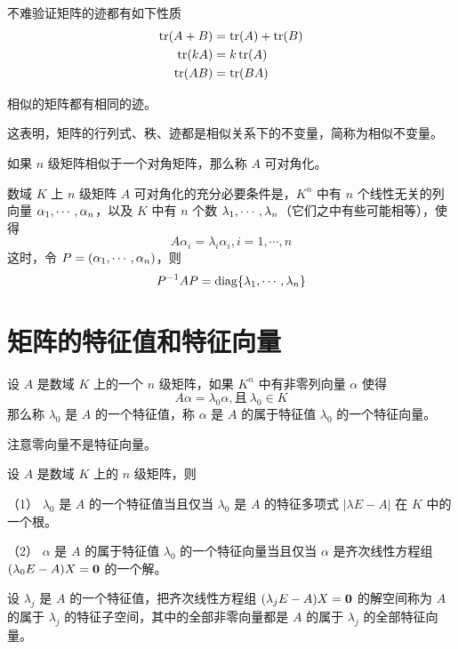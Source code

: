 不难验证矩阵的迹都有如下性质
\[
	\begin{aligned}
		\operatorname{tr}(A+B) & = \operatorname{tr}(A) + \operatorname{tr}(B) \\
		\operatorname{tr}(kA)  & = k\operatorname{tr}(A)         \\
		\operatorname{tr}(AB)  & = \operatorname{tr}(BA)
	\end{aligned}
\]

\begin{theorem}
	相似的矩阵都有相同的迹。
\end{theorem}

这表明，矩阵的行列式、秩、迹都是相似关系下的不变量，简称为相似不变量。

如果 $n$ 级矩阵相似于一个对角矩阵，那么称 $A$ 可对角化。

\begin{theorem}
	数域 $K$ 上 $n$ 级矩阵 $A$ 可对角化的充分必要条件是，$K^n$ 中有 $n$ 个线性无关的列向量 $\alpha_1,\cdots,\alpha_n$，以及 $K$ 中有 $n$ 个数 $\lambda_1,\cdots,\lambda_n$（它们之中有些可能相等），使得
	\[A\alpha_i = \lambda_i \alpha_i, i=1,\cdots,n\]
	这时，令 $P = (\alpha_1,\cdots,\alpha_n)$，则
	\[P^{-1}AP = \operatorname{diag}\{\lambda_1,\cdots,\lambda_n\}\]
\end{theorem}

\section{矩阵的特征值和特征向量}

\begin{definition}
	设 $A$ 是数域 $K$ 上的一个 $n$ 级矩阵，如果 $K^n$ 中有非零列向量 $\alpha$ 使得
	\[A \alpha = \lambda_0\alpha,\text{且}\ \lambda_0\in K\]
	那么称 $\lambda_0$ 是 $A$ 的一个特征值，称 $\alpha$ 是 $A$ 的属于特征值 $\lambda_0$ 的一个特征向量。
\end{definition}

注意零向量不是特征向量。

\begin{theorem}
	设 $A$ 是数域 $K$ 上的 $n$ 级矩阵，则
	
	（1） $\lambda_0$ 是 $A$ 的一个特征值当且仅当 $\lambda_0$ 是 $A$ 的特征多项式 $|\lambda E-A|$ 在 $K$ 中的一个根。
	
	（2） $\alpha$ 是 $A$ 的属于特征值 $\lambda_0$ 的一个特征向量当且仅当 $\alpha$ 是齐次线性方程组 $(\lambda_0E-A)X = \boldsymbol{0}$  的一个解。
\end{theorem}

设 $\lambda_j$ 是 $A$ 的一个特征值，把齐次线性方程组 $(\lambda_jE-A)X = \boldsymbol{0}$ 的解空间称为 $A$ 的属于 $\lambda_j$ 的特征子空间，其中的全部非零向量都是 $A$ 的属于 $\lambda_j$ 的全部特征向量。

